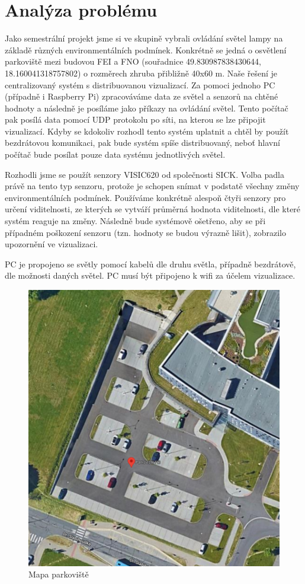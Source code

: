 \chapter{Analýza problému}

Jako semestrální projekt jsme si ve skupině vybrali ovládání světel lampy na základě různých environmentálních podmínek. Konkrétně se jedná o osvětlení parkoviště mezi budovou FEI a FNO (souřadnice 49.830987838430644, 18.160041318757802) o rozměrech zhruba přibližně 40x60 m. Naše řešení je centralizovaný systém s distribuovanou vizualizací. Za pomoci jednoho PC (případně i Raspberry Pi) zpracováváme data ze světel a senzorů na chtěné hodnoty a následně je posíláme jako příkazy na ovládání světel. Tento počítač pak posílá data pomocí UDP protokolu po síti, na kterou se lze připojit vizualizací. Kdyby se kdokoliv rozhodl tento systém uplatnit a chtěl by použít bezdrátovou komunikaci, pak bude systém spíše distribuovaný, neboť hlavní počítač bude posílat pouze data systému jednotlivých světel. 

Rozhodli jsme se použít senzory VISIC620 od společnosti SICK. Volba padla právě na tento typ senzoru, protože je schopen snímat v podstatě všechny změny environmentálních podmínek. Používáme konkrétně alespoň čtyři senzory pro určení viditelnosti, ze kterých se vytváří průměrná hodnota viditelnosti, dle které systém reaguje na změny. Následně bude systémově ošetřeno, aby se při případném poškození senzoru (tzn. hodnoty se budou výrazně lišit), zobrazilo upozornění ve vizualizaci.\parencite{senzor}

PC je propojeno se světly pomocí kabelů dle druhu světla, případně bezdrátově, dle možnosti daných světel. PC musí být připojeno k wifi za účelem vizualizace.


\begin{figure}[H]
    \centering\includegraphics[width=.5\textwidth]{Figures/Mapa.png}   
    \caption{Mapa parkoviště}
    \label{Obr-Navrh-viz}
\end{figure}

